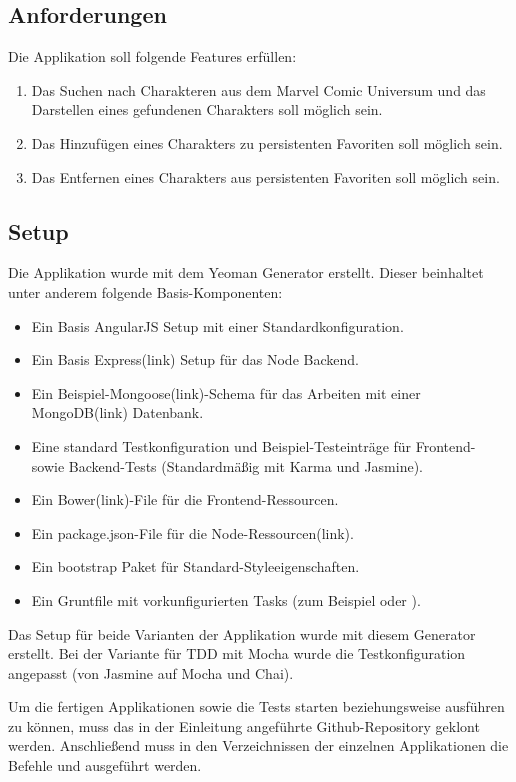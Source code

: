  \subsection{Anforderungen}
 Die Applikation  soll folgende Features erfüllen:
 \begin{enumerate}
   \item Das Suchen nach Charakteren aus dem Marvel Comic Universum und das Darstellen eines gefundenen Charakters soll möglich sein.
   \item Das Hinzufügen eines Charakters zu persistenten Favoriten soll möglich sein.
   \item Das Entfernen eines Charakters aus persistenten Favoriten soll möglich sein.
 \end{enumerate}

 \subsection{Setup}
 Die Applikation wurde mit dem Yeoman Generator  erstellt. Dieser beinhaltet unter anderem folgende Basis-Komponenten:
 \begin{itemize}
   \item Ein Basis AngularJS Setup mit einer Standardkonfiguration.
   \item Ein Basis Express(link) Setup für das Node Backend.
   \item Ein Beispiel-Mongoose(link)-Schema für das Arbeiten mit einer MongoDB(link) Datenbank.
   \item Eine standard Testkonfiguration und Beispiel-Testeinträge für Frontend- sowie Backend-Tests (Standardmäßig mit Karma und Jasmine).
   \item Ein Bower(link)-File für die Frontend-Ressourcen.
   \item Ein package.json-File für die Node-Ressourcen(link).
   \item Ein bootstrap Paket für Standard-Styleeigenschaften.
   \item Ein Gruntfile mit vorkunfigurierten Tasks (zum Beispiel  oder ).
 \end{itemize}

 Das Setup für beide Varianten der Applikation wurde mit diesem Generator erstellt. Bei der Variante für TDD mit Mocha wurde die Testkonfiguration angepasst (von Jasmine auf Mocha und Chai).

 Um die fertigen Applikationen sowie die Tests starten beziehungsweise ausführen zu können, muss das in der Einleitung angeführte Github-Repository geklont werden. Anschließend muss in den Verzeichnissen der einzelnen Applikationen die Befehle  und  ausgeführt werden.

